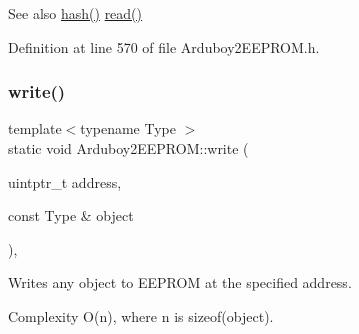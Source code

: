 \begin{DoxySeeAlso}{See also}
\mbox{\hyperlink{classArduboy2EEPROM_a0d81ac363020a75a0b56af7eb014f5b4}{hash()}} \mbox{\hyperlink{classArduboy2EEPROM_a6e9b09f0b94295c040204ca0cb674649}{read()}} 
\end{DoxySeeAlso}


Definition at line 570 of file Arduboy2\+E\+E\+P\+R\+O\+M.\+h.

\mbox{\label{classArduboy2EEPROM_abf7be1f27f4815de59257210dac8c9eb}} 
\subsubsection{\texorpdfstring{write()}{write()}}
{\footnotesize\ttfamily template$<$typename Type $>$ \\
static void Arduboy2\+E\+E\+P\+R\+O\+M\+::write (\begin{DoxyParamCaption}\item[{uintptr\+\_\+t}]{address,  }\item[{const Type \&}]{object }\end{DoxyParamCaption})\hspace{0.3cm}{\ttfamily [inline]}, {\ttfamily [static]}}



Writes any object to E\+E\+P\+R\+OM at the specified address. 

\begin{DoxyParagraph}{Complexity}
{\ttfamily O(n)}, where {\ttfamily n} is {\ttfamily sizeof(object)}.
\end{DoxyParagraph}

